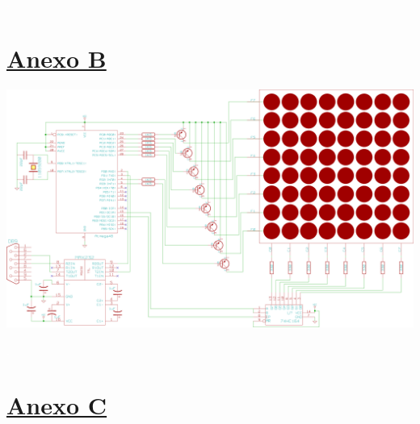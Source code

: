 \documentclass[a4paper,titlepage,10pt,oneside]{article}
\begin{document}

\newpage
\begin{center}
 \textcolor{White}{.} \\
 \vspace{9cm}
 \section*{\Huge{\textbf{\underline{Anexo B}}}}\label{anexob}
\end{center}

\newpage
  \includegraphics[angle=90,width=400pt]{./images/esq.png}


\newpage
\begin{center}
 \textcolor{White}{.} \\
 \vspace{9cm}
 \section*{\Huge{\textbf{\underline{Anexo C}}}}\label{anexoc}
\end{center}
\end{document}
